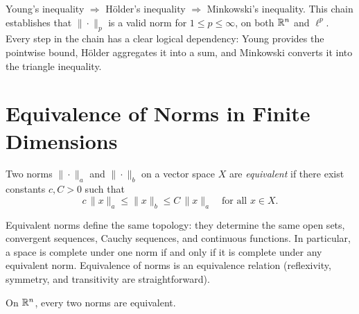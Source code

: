 \documentclass[11pt,a4paper]{article}
\begin{document}
\begin{keyresult}[title={The $L^p$ Inequality Chain}]
Young's inequality $\Rightarrow$ H\"older's inequality $\Rightarrow$
Minkowski's inequality. This chain establishes that $\|\cdot\|_p$ is a valid
norm for $1 \le p \le \infty$, on both $\mathbb{R}^n$ and $\ell^p$. Every step in
the chain has a clear logical dependency: Young provides the pointwise bound,
H\"older aggregates it into a sum, and Minkowski converts it into the
triangle inequality.
\end{keyresult}


\section{Equivalence of Norms in Finite Dimensions}
\label{sec:norm_equiv}

\begin{definition}
\label{def:norm_equiv}
Two norms $\|\cdot\|_a$ and $\|\cdot\|_b$ on a vector space $X$ are
\emph{equivalent} if there exist constants $c, C > 0$ such that
\[
c\, \|x\|_a \le \|x\|_b \le C\, \|x\|_a \quad \text{for all } x \in X.
\]
\end{definition}

\begin{remark}
\label{rem:equiv_topology}
Equivalent norms define the same topology: they determine the same open sets,
convergent sequences, Cauchy sequences, and continuous functions. In
particular, a space is complete under one norm if and only if it is complete
under any equivalent norm. Equivalence of norms is an equivalence relation
(reflexivity, symmetry, and transitivity are straightforward).
\end{remark}

\begin{theorem}
\label{thm:norm_equiv}
On $\mathbb{R}^n$, every two norms are equivalent.
\end{theorem}
\end{document}
